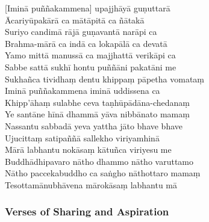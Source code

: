 
[Iminā puññakammena] upajjhāyā guṇuttarā\\
Ācariyūpakārā ca mātāpitā ca ñātakā\\
Suriyo candimā rājā guṇavantā narāpi ca\\
Brahma-mārā ca indā ca lokapālā ca devatā\\
Yamo mittā manussā ca majjhattā verikāpi ca\\
Sabbe sattā sukhī hontu puññāni pakatāni me\\
Sukhañca tividhaṃ dentu khippaṃ pāpetha vomataṃ\\
Iminā puññakammena iminā uddissena ca\\
Khipp'āhaṃ sulabhe ceva taṇhūpādāna-chedanaṃ\\
Ye santāne hīnā dhammā yāva nibbānato mamaṃ\\
Nassantu sabbadā yeva yattha jāto bhave bhave\\
Ujucittaṃ satipaññā sallekho viriyamhinā\\
Mārā labhantu nokāsaṃ kātuñca viriyesu me\\
Buddhādhipavaro nātho dhammo nātho varuttamo\\
Nātho paccekabuddho ca saṅgho nāthottaro mamaṃ\\
Tesottamānubhāvena mārokāsaṃ labhantu mā


\subsubsection{Verses of Sharing and Aspiration}

\begin{leader}
\end{leader}


